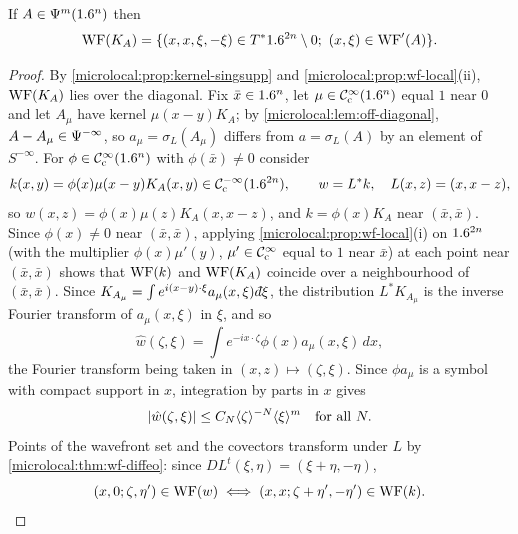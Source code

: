 \begin{proposition}\label{microlocal:prop:wf-kernel}
  If $A\in\Psi^{m}(1.6^n)$ then
  \begin{equation*}
    \WF(K_A)=\{(x,x,\xi,-\xi)\in\Tz{\R^{2n}};\ (x,\xi)\in\WFp(A)\}.
  \end{equation*}
\end{proposition}
\begin{proof}
  By \cref{microlocal:prop:kernel-singsupp} and
  \cref{microlocal:prop:wf-local}(ii), $\operatorname{WF}(K_A)$ lies over the diagonal.
  Fix $\bar x\in1.6^n$, let $\mu\in\mathcal{C}^\infty_{\mathrm{c}}(1.6^n)$ equal $1$ near $0$ and let
  $A_\mu$ have kernel $\mu(x-y)K_A$; by \cref{microlocal:lem:off-diagonal},
  $A-A_\mu\in\Psi^{-\infty}$, so $a_\mu=\sigma_L(A_\mu)$ differs from
  $a=\sigma_L(A)$ by an element of $S^{-\infty}$. For $\phi\in\mathcal{C}^\infty_{\mathrm{c}}(1.6^n)$
  with $\phi(\bar x)\ne0$ consider
  \begin{equation*}
    k(x,y)=\phi(x)\mu(x-y)K_A(x,y)\in\mathcal{C}^{-\infty}_{\mathrm{c}}(1.6^{2n}),\qquad
    w=L^*k,\quad L(x,z)=(x,x-z),
  \end{equation*}
  so $w(x,z)=\phi(x)\mu(z)K_A(x,x-z)$, and $k=\phi(x)K_A$ near $(\bar
  x,\bar x)$. Since $\phi(x)\ne0$ near $(\bar x,\bar x)$, applying
  \cref{microlocal:prop:wf-local}(i) on $1.6^{2n}$ (with the multiplier
  $\phi(x)\mu'(y)$, $\mu'\in\mathcal{C}^\infty_{\mathrm{c}}$ equal to $1$ near $\bar x$) at each point
  near $(\bar x,\bar x)$ shows that $\operatorname{WF}(k)$ and $\operatorname{WF}(K_A)$ coincide over a
  neighbourhood of $(\bar x,\bar x)$.
  Since $K_{A_\mu}=\int e^{i(x-y)\cdot\xi}a_\mu(x,\xi)\,\dbar\xi$, the
  distribution $L^*K_{A_\mu}$ is the inverse Fourier transform of
  $a_\mu(x,\xi)$ in $\xi$, and so
  \begin{equation*}
    \hat w(\zeta,\xi)=\int e^{-ix\cdot\zeta}\phi(x)a_\mu(x,\xi)\,dx,
  \end{equation*}
  the Fourier transform being taken in $(x,z)\mapsto(\zeta,\xi)$. Since
  $\phi a_\mu$ is a symbol with compact support in $x$, integration by parts
  in $x$ gives
  \begin{equation}\label{microlocal:eq:kernel-ft}
    \lvert \hat w(\zeta,\xi)\rvert\le C_N\langle \zeta\rangle^{-N}\langle \xi\rangle^m\quad\text{for all }N.
  \end{equation}
  Points of the wavefront set and the covectors transform under $L$ by
  \cref{microlocal:thm:wf-diffeo}: since $DL^t(\xi,\eta)=(\xi+\eta,-\eta)$,
  \begin{equation}\label{microlocal:eq:kernel-L}
    (x,0;\zeta,\eta')\in\operatorname{WF}(w)\iff
    (x,x;\zeta+\eta',-\eta')\in\operatorname{WF}(k).
  \end{equation}


\end{proof}
